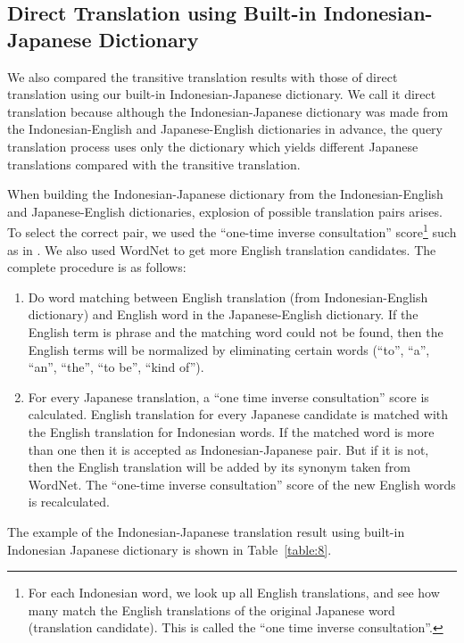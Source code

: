 \documentclass[english]{jnlp_1.3c}
\begin{document}
 
\subsection{Direct Translation using Built-in Indonesian-Japanese Dictionary}
\label{Direct Translation using Built-in Indonesian-Japanese Dictionary}
We also compared the transitive translation results with those of direct
translation using our built-in Indonesian-Japanese dictionary. We call
it direct translation because although the Indonesian-Japanese
dictionary was made from the Indonesian-English and Japanese-English
dictionaries in advance, the query translation process uses only the
dictionary which yields different Japanese translations compared with
the transitive translation.  

When building the Indonesian-Japanese
dictionary from the Indonesian-English and Japanese-English
dictionaries, explosion of possible translation pairs arises.  To select
the correct pair, we used the ``one-time inverse consultation''
score\footnote{For each Indonesian word, we look up all English
translations, and see how many match the English translations of the
original Japanese word (translation candidate). This is called the ``one
time inverse consultation''.}  such as in \cite{tanaka1994}.  We also
used WordNet to get more English translation candidates. The complete
procedure is as follows:

\begin{enumerate}
 \item Do word matching between English translation (from
       Indonesian-English dictionary) and English word in the
       Japanese-English dictionary. If the English term is phrase and
       the matching word could not be found, then the English terms will
       be normalized by eliminating certain words (``to'', ``a'',
       ``an'', ``the'', ``to be'', ``kind of'').
 \item For every Japanese translation, a ``one time inverse
       consultation'' score is calculated.   
       English translation for every
       Japanese candidate is matched with the English translation for
       Indonesian words. If the matched word is more than one then it is
       accepted as Indonesian-Japanese pair. But if it is not, then the
       English translation will be added by its synonym taken from
       WordNet. The ``one-time inverse consultation'' score of the new
       English words is recalculated.
\end{enumerate}

The example of the Indonesian-Japanese translation result using built-in
Indonesian Japanese dictionary is shown in Table~\ref{table:8}.
\end{document}

